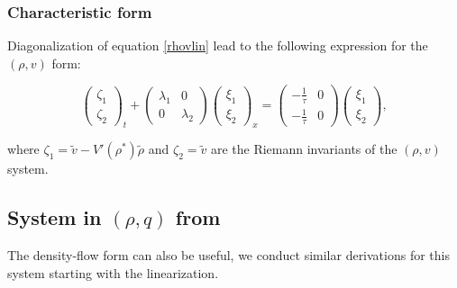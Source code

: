 \documentclass[a4paper, 10pt, conference]{ieeeconf}      %
\begin{document}
\subsubsection{Characteristic form}
Diagonalization of equation \eqref{rhovlin} lead to the following expression for the $\left( \rho, v \right)$ form:

{\footnotesize
\begin{equation}
\begin{pmatrix}
	\zeta_1 \\ 
	\zeta_2
\end{pmatrix}_t
+ 
\begin{pmatrix}
	\lambda_1 & 0 
	\\
	0 & \lambda_2 
\end{pmatrix}
\begin{pmatrix}
	\xi_1 \\ 
	\xi_2
\end{pmatrix}_x
= 
\begin{pmatrix}
	-\frac{1}{\tau} & 0 \\
	-\frac{1}{\tau} & 0
\end{pmatrix}
\begin{pmatrix}
\xi_1 \\ \xi_2
\end{pmatrix},
\end{equation}
}

where
{\footnotesize
$\zeta_1 = \tilde{v} - V'( \rho^* )\tilde{\rho}$ and $\zeta_2 = \tilde{v}$
}
are the Riemann invariants of the $(\rho, v)$ system.


\subsection{System in $(\rho, q)$ from}
The density-flow form can also be useful, we conduct similar derivations for this system starting with the linearization.
\end{document}
